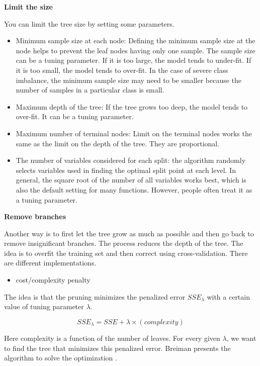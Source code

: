 \documentclass[12pt,]{krantz}
\providecommand{\tightlist}{%
  \setlength{\itemsep}{0pt}\setlength{\parskip}{0pt}}
\begin{document}
\textbf{Limit the size}

You can limit the tree size by setting some parameters.

\begin{itemize}
\item
  Minimum sample size at each node: Defining the minimum sample size at the node helps to prevent the leaf nodes having only one sample. The sample size can be a tuning parameter. If it is too large, the model tends to under-fit. If it is too small, the model tends to over-fit. In the case of severe class imbalance, the minimum sample size may need to be smaller because the number of samples in a particular class is small.
\item
  Maximum depth of the tree: If the tree grows too deep, the model tends to over-fit. It can be a tuning parameter.
\item
  Maximum number of terminal nodes: Limit on the terminal nodes works the same as the limit on the depth of the tree. They are proportional.
\item
  The number of variables considered for each split: the algorithm randomly selects variables used in finding the optimal split point at each level. In general, the square root of the number of all variables works best, which is also the default setting for many functions. However, people often treat it as a tuning parameter.
\end{itemize}

\textbf{Remove branches}

Another way is to first let the tree grow as much as possible and then go back to remove insignificant branches. The process reduces the depth of the tree. The idea is to overfit the training set and then correct using cross-validation. There are different implementations.

\begin{itemize}
\tightlist
\item
  cost/complexity penalty
\end{itemize}

The idea is that the pruning minimizes the penalized error \(SSE_{\lambda}\) with a certain value of tuning parameter \(\lambda\).

\[SSE_{\lambda} = SSE+\lambda \times (complexity)\]

Here complexity is a function of the number of leaves. For every given \(\lambda\), we want to find the tree that minimizes this penalized error. Breiman presents the algorithm to solve the optimization \citep{Breiman1984}.
\end{document}
